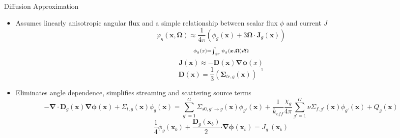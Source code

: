 \begin{frame}[t]{Diffusion Approximation}
    
    \begin{itemize}
      \item Assumes linearly anisotropic angular flux and a simple relationship between scalar flux $\phi$ and current $J$
      \begin{equation*}\scriptstyle
       \varphi_g\left(\bm x,\bm \Omega\right) \approx 
       \frac{1}{4\pi}\left(\phi_g\left(\bm x\right) + 3\bm \Omega \cdot \bm 
       J_g\left(\bm x\right)\right)
      \end{equation*}
      \begin{equation*}\scriptstyle
      \phi_g\left(x\right)= \intop_{4\pi} \psi_g\left(\bm x, \bm \Omega\right) d\Omega
      \end{equation*}
      \begin{equation*}\scriptstyle
      \bm J\left(\bm x\right) \approx -\bm D\left(\bm x\right) \bm \nabla 
      \bm \phi\left(x\right)
      \end{equation*}
      \begin{equation*}\scriptstyle
      \bm D\left(\bm x\right)  = \frac{1}{3}\left(\bm \Sigma_{tr,g}\left(\bm 
      x\right)\right)^{-1}
      \end{equation*}
      \item Eliminates angle dependence, simplifies streaming and scattering source terms
      \begin{dmath*}\scriptstyle\label{e:DiffusionEquation}
          {-\bm\nabla \cdot  \bm D_g\left(\bm x\right)\bm{\nabla} \bm \phi\left(\bm x\right)+ \Sigma_{t,g}\left(\bm x\right)\phi_g\left(\bm x\right) = 
              \sum_{g'=1}^G \Sigma_{s0,g'\rightarrow g}\left(\bm 
              x\right)\phi_{g'}\left(\bm x\right)} + 
          {\frac{1}{k_{eff}}\frac{\chi_g}{4\pi} \sum_{g'=1}^G 
              \nu\Sigma_{f,g'}\left(\bm x\right)\phi_{g'}\left(\bm x\right)} + 
          Q_g\left(\bm x\right)
      \end{dmath*}
      \begin{equation*}\scriptstyle\label{e:DiffusionEquationBC}
      \frac{1}{4} \phi_g\left(\bm x_b\right) + \frac{\bm D_g\left(\bm x_b\right)}{2} 
      \bm \cdot \bm \nabla \bm \phi\left(\bm x_b\right) = J^-_g\left(\bm x_b\right)
      \end{equation*}
    \end{itemize}
  
\end{frame}